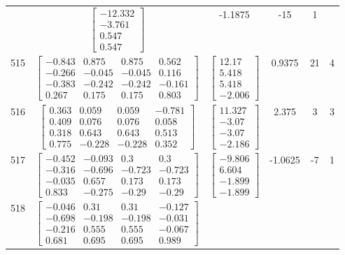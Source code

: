 \documentclass[a4paper,12pt]{article}
\begin{document}
\begin{tabular}{c c c c c c}
&
$\begin{bmatrix} -12.332 \\ -3.761 \\ 0.547 \\ 0.547 \end{bmatrix}$
&
-1.1875
&
-15
&
1
\\
515
&
$\begin{bmatrix} -0.843 & 0.875 & 0.875 & 0.562 \\ -0.266 & -0.045 & -0.045 & 0.116 \\ -0.383 & -0.242 & -0.242 & -0.161 \\ 0.267 & 0.175 & 0.175 & 0.803 \end{bmatrix}$
&
$\begin{bmatrix} 12.17 \\ 5.418 \\ 5.418 \\ -2.006 \end{bmatrix}$
&
0.9375
&
21
&
4
\\
516
&
$\begin{bmatrix} 0.363 & 0.059 & 0.059 & -0.781 \\ 0.409 & 0.076 & 0.076 & 0.058 \\ 0.318 & 0.643 & 0.643 & 0.513 \\ 0.775 & -0.228 & -0.228 & 0.352 \end{bmatrix}$
&
$\begin{bmatrix} 11.327 \\ -3.07 \\ -3.07 \\ -2.186 \end{bmatrix}$
&
2.375
&
3
&
3
\\
517
&
$\begin{bmatrix} -0.452 & -0.093 & 0.3 & 0.3 \\ -0.316 & -0.696 & -0.723 & -0.723 \\ -0.035 & 0.657 & 0.173 & 0.173 \\ 0.833 & -0.275 & -0.29 & -0.29 \end{bmatrix}$
&
$\begin{bmatrix} -9.806 \\ 6.604 \\ -1.899 \\ -1.899 \end{bmatrix}$
&
-1.0625
&
-7
&
1
\\
518
&
$\begin{bmatrix} -0.046 & 0.31 & 0.31 & -0.127 \\ -0.698 & -0.198 & -0.198 & -0.031 \\ -0.216 & 0.555 & 0.555 & -0.067 \\ 0.681 & 0.695 & 0.695 & 0.989 \end{bmatrix}$

\end{tabular}
\end{document}
